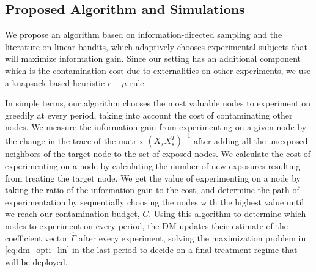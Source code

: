 \documentclass[11pt,a4paper]{article}
\begin{document}
\subsection{Proposed Algorithm and Simulations}

We propose an algorithm based on information-directed sampling and the literature on linear bandits, which adaptively chooses experimental subjects that will maximize information gain. Since our setting has an additional component which is the contamination cost due to externalities on other experiments, we use a knapsack-based heuristic $c-\mu$ rule.

In simple terms, our algorithm chooses the most valuable nodes to experiment on greedily at every period, taking into account the cost of contaminating other nodes. We measure the information gain from experimenting on a given node by the change in the trace of the matrix $( X_s X_s^T)^{-1}$ after adding all the unexposed neighbors of the target node to the set of exposed nodes. We calculate the cost of experimenting on a node by calculating the number of new exposures resulting from treating the target node. We get the value of experimenting on a node by taking the ratio of the information gain to the cost, and determine the path of experimentation by sequentially choosing the nodes with the highest value until we reach our contamination budget, $\bar{C}$. Using this algorithm to determine which nodes to experiment on every period, the DM updates their estimate of the coefficient vector $\hat \Gamma$ after every experiment, solving the maximization problem in \eqref{eq:dm_opti_lin} in the last period to decide on a final treatment regime that will be deployed.
\end{document}
